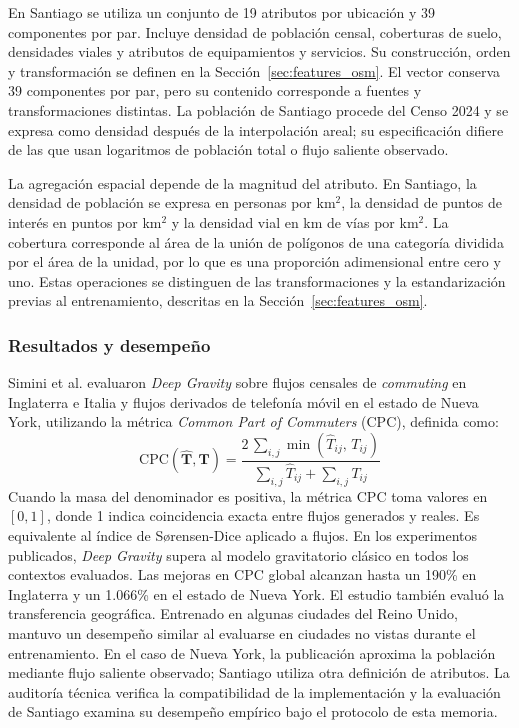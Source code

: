 En Santiago se utiliza un conjunto de 19 atributos por ubicación y 39 componentes por par. Incluye densidad de población censal, coberturas de suelo, densidades viales y atributos de equipamientos y servicios. Su construcción, orden y transformación se definen en la Sección~\ref{sec:features_osm}. El vector conserva 39 componentes por par, pero su contenido corresponde a fuentes y transformaciones distintas. La población de Santiago procede del Censo 2024 y se expresa como densidad después de la interpolación areal; su especificación difiere de las que usan logaritmos de población total o flujo saliente observado.

La agregación espacial depende de la magnitud del atributo. En Santiago, la densidad de población se expresa en personas por km$^2$, la densidad de puntos de interés en puntos por km$^2$ y la densidad vial en km de vías por km$^2$. La cobertura corresponde al área de la unión de polígonos de una categoría dividida por el área de la unidad, por lo que es una proporción adimensional entre cero y uno. Estas operaciones se distinguen de las transformaciones y la estandarización previas al entrenamiento, descritas en la Sección~\ref{sec:features_osm}.

\subsubsection{Resultados y desempeño}

Simini et al. \cite{simini2021deep} evaluaron \textit{Deep Gravity} sobre flujos censales de \textit{commuting} en Inglaterra e Italia y flujos derivados de telefonía móvil en el estado de Nueva York, utilizando la métrica \textit{Common Part of Commuters} (CPC), definida como:
\begin{equation}
    \text{CPC}(\hat{\mathbf{T}}, \mathbf{T}) = \frac{2\,\displaystyle\sum_{i,j} \min\!\left(\hat{T}_{ij},\, T_{ij}\right)}{\displaystyle\sum_{i,j} \hat{T}_{ij} + \displaystyle\sum_{i,j} T_{ij}}
    \label{eq:cpc}
\end{equation}
Cuando la masa del denominador es positiva, la métrica CPC toma valores en $[0,1]$, donde 1 indica coincidencia exacta entre flujos generados y reales. Es equivalente al índice de Sørensen-Dice aplicado a flujos. En los experimentos publicados, \textit{Deep Gravity} supera al modelo gravitatorio clásico en todos los contextos evaluados. Las mejoras en CPC global alcanzan hasta un 190\% en Inglaterra y un 1.066\% en el estado de Nueva York. El estudio también evaluó la transferencia geográfica. Entrenado en algunas ciudades del Reino Unido, mantuvo un desempeño similar al evaluarse en ciudades no vistas durante el entrenamiento. En el caso de Nueva York, la publicación aproxima la población mediante flujo saliente observado; Santiago utiliza otra definición de atributos. La auditoría técnica verifica la compatibilidad de la implementación y la evaluación de Santiago examina su desempeño empírico bajo el protocolo de esta memoria.

